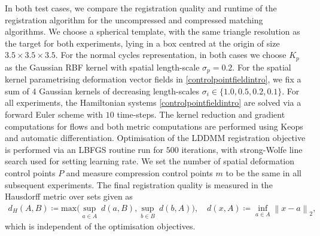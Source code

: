 \documentclass[sn-mathphys-num]{sn-jnl}%
\theoremstyle{thmstyleone}%
\theoremstyle{thmstyletwo}%
\theoremstyle{thmstylethree}%
\numberwithin{remark}{section}
\numberwithin{definition}{section}
\numberwithin{equation}{section}
\numberwithin{theorem}{section}
\newcommand{\norm}[1]{\left\lVert#1\right\rVert}
\begin{document}
In both test cases, we compare the registration quality and runtime of the registration algorithm for the uncompressed and compressed matching algorithms. We choose a spherical template, with the same triangle resolution as the target for both experiments, lying in a box centred at the origin of size $3.5\times 3.5 \times 3.5$. For the normal cycles representation, in both cases we choose $K_{p}$ as the Gaussian RBF kernel with spatial length-scale $\sigma_{p} = 0.2$. For the spatial kernel parametrising deformation vector fields in \cref{controlpointfieldintro}, we fix a sum of $4$ Gaussian kernels of decreasing length-scales $\sigma_{i} \in \{1.0,0.5,0.2,0.1\}$. For all experiments, the Hamiltonian systems \cref{controlpointfieldintro} are solved via a forward Euler scheme with $10$ time-steps. The kernel reduction and gradient computations for flows and both metric computations are performed using Keops and automatic differentiation. Optimisation of the LDDMM registration objective is performed via an LBFGS routine run for $500$ iterations, with strong-Wolfe line search used for setting learning rate. We set the number of spatial deformation control points $P$ and measure compression control points $m$ to be the same in all subsequent experiments. The final registration quality is measured in the Hausdorff metric over sets given as
\begin{align*}
    d_{H}(A,B) \coloneq \mathrm{max}\bigg(  \underset{a \in A}{\sup }{\ d(a,B)},  \underset{b \in B}{\sup }{\ d(b,A)}\bigg),\quad d(x,A) \coloneq \underset{a \in A}{\inf}{\norm{x-a}_{2}},
\end{align*}
which is independent of the optimisation objectives.
\end{document}
